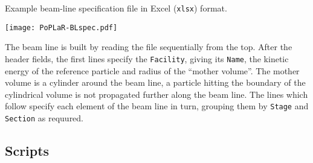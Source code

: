 \begin{table}[h]
  \caption{Example beam-line specification file in Excel
    (\texttt{xlsx}) format.
  }
  \label{Tab:BLspec}
  \begin{center}
    \texttt{[image: PoPLaR-BLspec.pdf]}
  \end{center}
\end{table}

The beam line is built by reading the file sequentially from the top.
After the header fields, the first lines specify
the \texttt{Facility}, giving its \texttt{Name}, the kinetic energy of
the reference particle and radius of the ``mother volume''.
The mother volume is a cylinder around the beam line, a particle
hitting the boundary of the cylindrical volume is not propagated
further along the beam line.
The lines which follow specify each element of the beam line in turn,
grouping them by \texttt{Stage} and \texttt{Section} as requured.

\subsection{Scripts}

